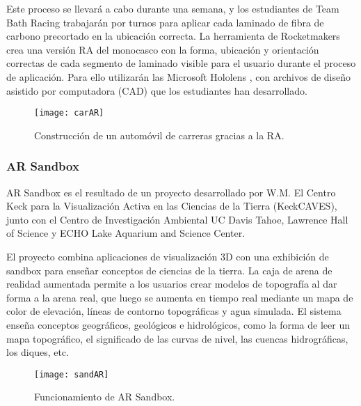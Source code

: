 Este proceso se llevará a cabo durante una semana, y los estudiantes de Team Bath Racing trabajarán por turnos para aplicar cada laminado de fibra de carbono precortado en la ubicación correcta. La herramienta de Rocketmakers crea una versión RA del monocasco con la forma, ubicación y orientación correctas de cada segmento de laminado visible para el usuario durante el proceso de aplicación. Para ello utilizarán las Microsoft Hololens \cite{URL::hololens}, con archivos de diseño asistido por computadora (CAD) que los estudiantes han desarrollado.

\begin{figure}[h]
    \centering
    \texttt{[image: carAR]}
    \caption{Construcción de un automóvil de carreras gracias a la RA.}
    \label{fig:xyz}
\end{figure}    
 

\subsubsection{AR Sandbox} 
AR Sandbox \cite{URL::sandbox} es el resultado de un proyecto desarrollado por W.M. El Centro Keck para la Visualización Activa en las Ciencias de la Tierra (KeckCAVES), junto con el Centro de Investigación Ambiental UC Davis Tahoe, Lawrence Hall of Science y ECHO Lake Aquarium and Science Center.

El proyecto combina aplicaciones de visualización 3D con una exhibición de sandbox para enseñar conceptos de ciencias de la tierra. La caja de arena de realidad aumentada  permite a los usuarios crear modelos de topografía al dar forma a la arena real, que luego se aumenta en tiempo real mediante un mapa de color de elevación, líneas de contorno topográficas y agua simulada. El sistema enseña conceptos geográficos, geológicos e hidrológicos, como la forma de leer un mapa topográfico, el significado de las curvas de nivel, las cuencas hidrográficas, los diques, etc.

\begin{figure}[h]
    \centering
    \texttt{[image: sandAR]}
    \caption{Funcionamiento de AR Sandbox.}
    \label{fig:xyz}
\end{figure}    




